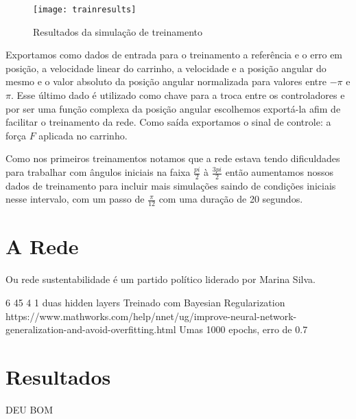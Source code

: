 \documentclass{article}
\begin{document}
\begin{figure}[H]
	\centering
	\texttt{[image: trainresults]}
	\caption{Resultados da simulação de treinamento}
	\label{fig:trainresults}
\end{figure}


Exportamos como dados de entrada para o treinamento a referência e o erro em posição, a velocidade linear do carrinho, a velocidade e a posição angular do mesmo e o valor absoluto da posição angular normalizada para valores entre $-\pi$ e $\pi$. Esse último dado é utilizado como chave para a troca entre os controladores e por ser uma função complexa da posição angular escolhemos exportá-la afim de facilitar o treinamento da rede.
Como saída exportamos o sinal de controle: a força $F$ aplicada no carrinho.

Como nos primeiros treinamentos notamos que a rede estava tendo dificuldades para trabalhar com ângulos iniciais na faixa $\frac{pi}{2}$ à $\frac{3pi}{2}$ então aumentamos nossos dados de treinamento para incluir mais simulações saindo de condições iniciais nesse intervalo, com um passo de $\frac{\pi}{12}$ com uma duração de 20 segundos.

\section{A Rede}
Ou rede sustentabilidade é um partido político liderado por Marina Silva.

6 45 4 1
duas hidden layers
Treinado com Bayesian Regularization
https://www.mathworks.com/help/nnet/ug/improve-neural-network-generalization-and-avoid-overfitting.html
Umas 1000 epochs, erro de 0.7

\section{Resultados}
DEU BOM
\pagebreak
\end{document}
